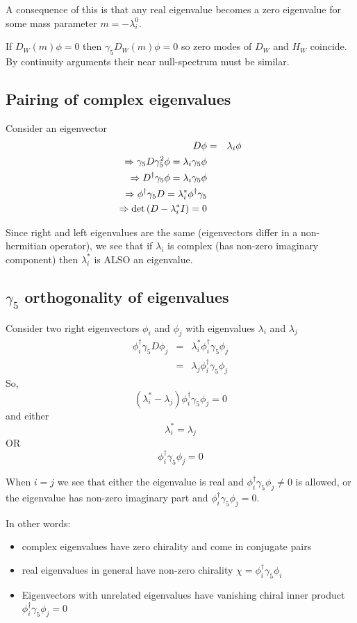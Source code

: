 \documentclass[letter,10pt]{report}
\begin{document}
A consequence of this is that any real eigenvalue becomes a zero eigenvalue for some mass parameter $m=-\lambda_i^0$.

If $D_W(m) \phi = 0$ then $\gamma_5 D_W(m) \phi = 0$ so zero modes of $D_W$ and $H_W$ coincide. By continuity arguments their near null-spectrum
must be similar.

\subsection{Pairing of complex eigenvalues}

Consider an eigenvector
\begin{eqnarray}
  D \phi &=& \lambda_i \phi \\
\Rightarrow  \gamma_5 D \gamma_5^2 \phi= \lambda_i \gamma_5 \phi\\
\Rightarrow   D^\dagger \gamma_5 \phi= \lambda_i \gamma_5 \phi\\
\Rightarrow   \phi^\dagger \gamma_5 D = \lambda_i^\ast  \phi^\dagger \gamma_5\\
\Rightarrow   {\rm det} \left( D - \lambda_i^\ast I \right) = 0
\end{eqnarray}

Since right and left eigenvalues are the same (eigenvectors differ in a non-hermitian operator), we see
that if $\lambda_i$ is complex (has non-zero imaginary component) then $\lambda_i^\ast$ is ALSO an eigenvalue.

\subsection{$\gamma_5$ orthogonality of eigenvalues}

Consider two right eigenvectors $\phi_i$ and $\phi_j$ with eigenvalues $\lambda_i$ and $\lambda_j$
\begin{eqnarray}
  \phi_i^\dagger \gamma_5 D \phi_j &=& \lambda_i^\ast \phi_i^\dagger \gamma_5 \phi_j\\
  &=& \lambda_j \phi_i^\dagger \gamma_5 \phi_j
\end{eqnarray}
So,
$$
(\lambda_i^\ast - \lambda_j)   \phi_i^\dagger \gamma_5 \phi_j = 0
$$
and either
$$
\lambda_i^\ast = \lambda_j 
$$
OR
$$
\phi_i^\dagger \gamma_5  \phi_j = 0
$$

When $i=j$ we see that either the eigenvalue is real and $\phi_i^\dagger \gamma_5 \phi_j \ne 0$ is allowed,
or the eigenvalue has non-zero imaginary part and $\phi_i^\dagger \gamma_5 \phi_j = 0$.

In other words:
\begin{itemize}
\item complex eigenvalues have zero chirality and come in conjugate pairs
\item real eigenvalues in general have non-zero chirality $\chi = \phi_i^\dagger \gamma_5 \phi_i$
\item Eigenvectors with unrelated eigenvalues have vanishing chiral inner product $\phi_i^\dagger \gamma_5 \phi_j = 0$
\end{itemize}
\end{document}
